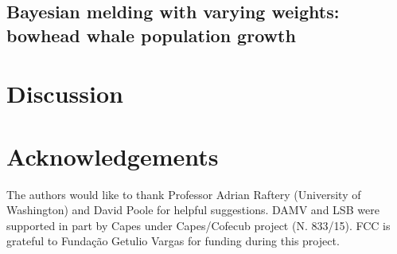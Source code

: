 \documentclass[a4paper, notitlepage, 10pt]{article}
\begin{document}

\subsection*{Bayesian melding with varying weights: bowhead whale population growth}


\section*{Discussion}


\section*{Acknowledgements}
The authors would like to thank Professor Adrian Raftery (University of Washington) and David Poole for helpful suggestions.
DAMV and LSB were supported in part by Capes under Capes/Cofecub project (N. 833/15).
FCC is grateful to Funda\c{c}\~ao Getulio Vargas for funding during this 
project.

\end{document}
